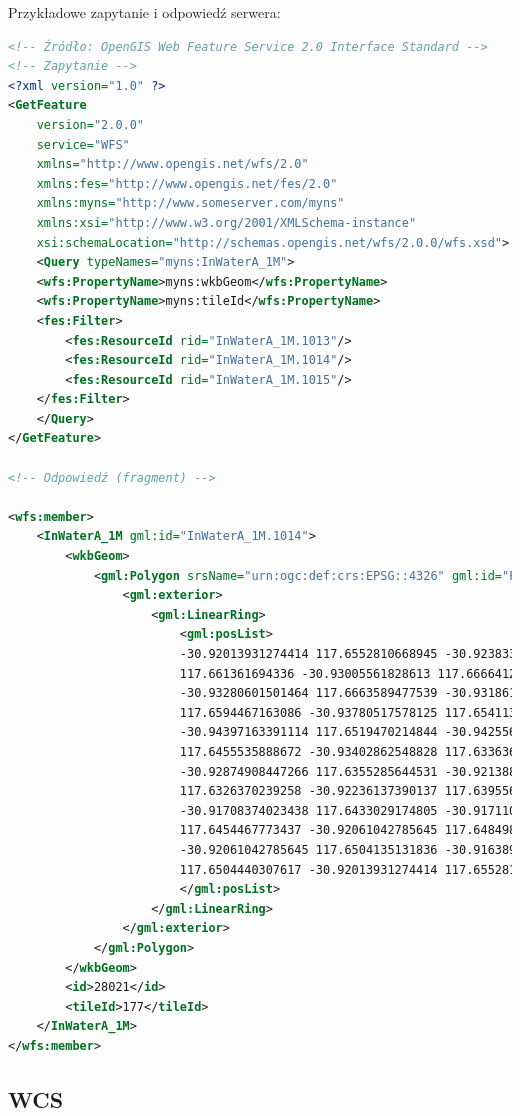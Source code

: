 Przykładowe zapytanie i odpowiedź serwera:
\begin{lstlisting}[frame=L, language=XML]
<!-- Źródło: OpenGIS Web Feature Service 2.0 Interface Standard -->
<!-- Zapytanie -->
<?xml version="1.0" ?>
<GetFeature
    version="2.0.0"
    service="WFS"
    xmlns="http://www.opengis.net/wfs/2.0"
    xmlns:fes="http://www.opengis.net/fes/2.0"
    xmlns:myns="http://www.someserver.com/myns"
    xmlns:xsi="http://www.w3.org/2001/XMLSchema-instance"
    xsi:schemaLocation="http://schemas.opengis.net/wfs/2.0.0/wfs.xsd">
    <Query typeNames="myns:InWaterA_1M">
    <wfs:PropertyName>myns:wkbGeom</wfs:PropertyName>
    <wfs:PropertyName>myns:tileId</wfs:PropertyName>
    <fes:Filter>
        <fes:ResourceId rid="InWaterA_1M.1013"/>
        <fes:ResourceId rid="InWaterA_1M.1014"/>
        <fes:ResourceId rid="InWaterA_1M.1015"/>
    </fes:Filter>
    </Query>
</GetFeature>

<!-- Odpowiedź (fragment) -->

<wfs:member>
    <InWaterA_1M gml:id="InWaterA_1M.1014">
        <wkbGeom>
            <gml:Polygon srsName="urn:ogc:def:crs:EPSG::4326" gml:id="P2">
                <gml:exterior>
                    <gml:LinearRing>
                        <gml:posList>
                        -30.92013931274414 117.6552810668945 -30.92383384704589
                        117.661361694336 -30.93005561828613 117.6666412353516
                        -30.93280601501464 117.6663589477539 -30.93186187744141
                        117.6594467163086 -30.93780517578125 117.6541137695312
                        -30.94397163391114 117.6519470214844 -30.94255638122559
                        117.6455535888672 -30.93402862548828 117.6336364746094
                        -30.92874908447266 117.6355285644531 -30.92138862609864
                        117.6326370239258 -30.92236137390137 117.6395568847656
                        -30.91708374023438 117.6433029174805 -30.91711044311523
                        117.6454467773437 -30.92061042785645 117.6484985351563
                        -30.92061042785645 117.6504135131836 -30.91638946533203
                        117.6504440307617 -30.92013931274414 117.6552810668945
                        </gml:posList>
                    </gml:LinearRing>
                </gml:exterior>
            </gml:Polygon>
        </wkbGeom>
        <id>28021</id>
        <tileId>177</tileId>
    </InWaterA_1M>
</wfs:member> 
\end{lstlisting}

\subsection{WCS}

